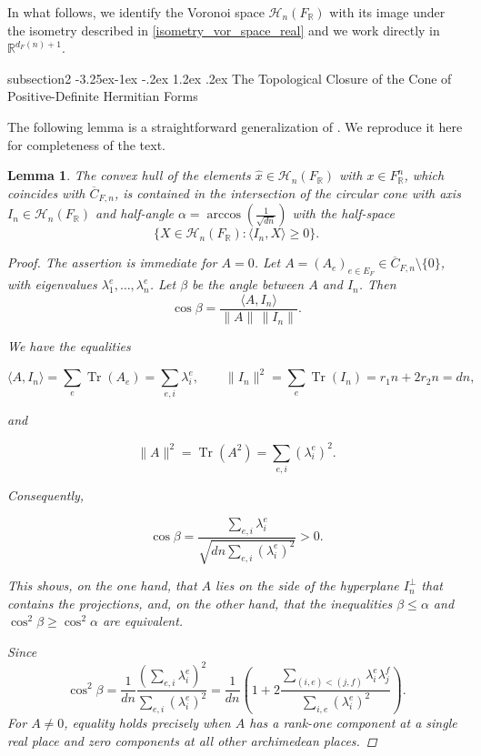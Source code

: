 \documentclass[11pt,a4paper,twoside]{amsart}
\makeatletter
\renewcommand{\subsection}{\@startsection
  {subsection}{2}{\z@}%
  {-3.25ex\@plus -1ex \@minus -.2ex}%
  {1.2ex \@plus .2ex}%
  {\normalfont\bfseries}}
\theoremstyle{plain}
\newtheorem{lemma}[theorem]{\bfseries Lemma}
\theoremstyle{definition}
\newcommand{\Her}[0]{\mathcal{H}_n(\fr)}
\newcommand{\fr}[0]{F_\mathbb{R}}
\renewcommand{\leq}{\leqslant}
\renewcommand{\geq}{\geqslant}
\makeatother
\begin{document}
In what follows, we identify the Voronoi space $\Her$ with its image under the isometry described in \eqref{isometry_vor_space_real} and we work directly in $\mathbb{R}^{d_F(n)+1}$.



\subsection{The Topological Closure of the Cone of Positive-Definite Hermitian Forms}

The following lemma is a straightforward generalization of \cite[Proposition 7.1.4] {euclidean_lattices_martinet}. We reproduce it here for completeness of the text.
\begin{lemma}\label{martinet}
The convex hull of the elements $\hat{x}\in\Her$ with $x\in\fr^n$, which coincides with $\overline{C}_{F,n}$, is contained in the intersection of the circular cone with axis $I_n\in\Her$ and half-angle $\alpha=\arccos\left(\frac{1}{\sqrt{dn}}\right)$ with the half-space $$\{X\in\Her:\langle I_n,X\rangle\geq 0\}.$$
\begin{proof}

The assertion is immediate for $A=0$.
Let $A=(A_e)_{e\in E_F}\in\overline C_{F,n}\setminus\{0\}$,
with eigenvalues $\lambda_1^e,\ldots,\lambda_n^e$. Let $\beta$ be the angle between $A$ and $I_n$. Then
$$
\cos \beta
=
\frac{\langle A,I_n\rangle}
{\|A\|\,\|I_n\|}.
$$

We have the equalities

$$
\langle A,I_n\rangle
=
\sum_e \operatorname{Tr}(A_e)
=
\sum_{e,i}\lambda_i^e,
\qquad
\|I_n\|^2
=
\sum_e\operatorname{Tr}(I_n) = r_1n+2r_2n
=
dn,
$$

and

$$
\|A\|^2
=
\operatorname{Tr}(A^2)
=
\sum_{e,i}(\lambda^e_i)^2.
$$

Consequently,

$$
\cos \beta
=
\frac{\sum_{e,i}\lambda_i^e}
{\sqrt{dn\sum_{e,i}(\lambda_i^e)^2}}
>0.
$$

This shows, on the one hand, that $A$ lies on the side of the
hyperplane $I_n^{\perp}$ that contains the projections,
and, on the other hand, that the inequalities
$\beta\leq\alpha$ and 
$\cos^2\beta\geq\cos^2\alpha$
are equivalent.

Since
$$
\cos^2\beta
=
\frac{1}{dn}
\frac{(\sum_{e,i}\lambda_i^e)^2}
{\sum_{e,i}(\lambda_i^e)^2}
=
\frac{1}{dn}
\left(
1+
2\frac{
\sum_{(i,e)<(j,f)}
\lambda^e_i\lambda^f_{j}
}{
\sum_{i,e}(\lambda^e_i)^2
}
\right).
$$
For $A\neq 0$, equality holds precisely when $A$ has a
rank-one component at a single real place and zero components
at all other archimedean places.
\end{proof}
\end{lemma}
\end{document}

